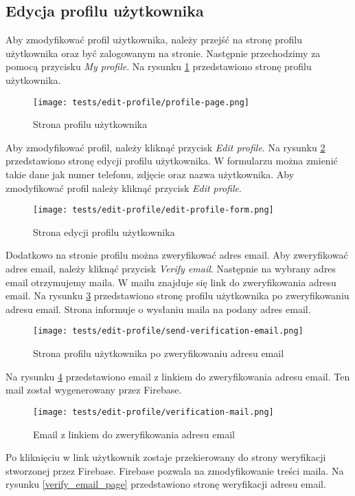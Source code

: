 \subsection{Edycja profilu użytkownika}
Aby zmodyfikować profil użytkownika, należy przejść na stronę profilu użytkownika oraz być zalogowanym na stronie. Następnie przechodzimy za pomocą przycisku \textit{My profile}. Na rysunku \ref{profile_page} przedstawiono stronę profilu użytkownika.
\begin{figure}[H]
  \centering
  \texttt{[image: tests/edit-profile/profile-page.png]}
  \caption{Strona profilu użytkownika}
  \label{profile_page}
\end{figure}
Aby zmodyfikować profil, należy kliknąć przycisk \textit{Edit profile}. Na rysunku \ref{edit_profile} przedstawiono stronę edycji profilu użytkownika. W formularzu można zmienić takie dane jak numer telefonu, zdjęcie oraz nazwa użytkownika. Aby zmodyfikować profil należy kliknąć przycisk \textit{Edit profile}.
\begin{figure}[H]
  \centering
  \texttt{[image: tests/edit-profile/edit-profile-form.png]}
  \caption{Strona edycji profilu użytkownika}
  \label{edit_profile}
\end{figure}
Dodatkowo na stronie profilu można zweryfikować adres email. Aby zweryfikować adres email, należy kliknąć przycisk \textit{Verify email}. Następnie na wybrany adres email otrzymujemy maila. W mailu znajduje się link do zweryfikowania adresu email.  Na rysunku \ref{verify_email} przedstawiono stronę profilu użytkownika po zweryfikowaniu adresu email. Strona informuje o wysłaniu maila na podany adres email.
\begin{figure}[H]
  \centering
  \texttt{[image: tests/edit-profile/send-verification-email.png]}
  \caption{Strona profilu użytkownika po zweryfikowaniu adresu email}
  \label{verify_email}
\end{figure}
Na rysunku \ref{verify_email_message} przedstawiono email z linkiem do zweryfikowania adresu email. Ten mail został wygenerowany przez Firebase. 
\begin{figure}[H]
  \centering
  \texttt{[image: tests/edit-profile/verification-mail.png]}
  \caption{Email z linkiem do zweryfikowania adresu email}
  \label{verify_email_message}
\end{figure}
Po kliknięciu w link użytkownik zostaje przekierowany do strony weryfikacji stworzonej przez Firebase. Firebase pozwala na zmodyfikowanie treści maila. Na rysunku \ref{verify_email_page} przedstawiono stronę weryfikacji adresu email.
